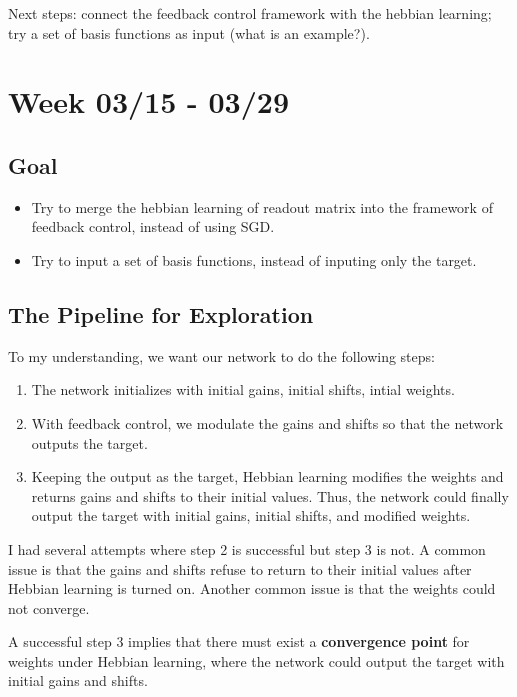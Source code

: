 \documentclass[12pt, a4paper]{article}
\begin{document}
Next steps: connect the feedback control framework with the hebbian learning; try a set of basis functions as input (what is an example?).

\newpage

\section*{Week 03/15 - 03/29}

\subsection*{Goal}

\noindent
\begin{itemize}
    \item Try to merge the hebbian learning of readout matrix into the framework of feedback control, instead of using SGD.
    \item Try to input a set of basis functions, instead of inputing only the target.

\end{itemize}

\newpage

\subsection*{The Pipeline for Exploration}

To my understanding, we want our network to do the following steps:

\begin{enumerate}
    \item The network initializes with initial gains, initial shifts, intial weights.
    \item With feedback control, we modulate the gains and shifts so that the network outputs the target.
    \item Keeping the output as the target, Hebbian learning modifies the weights and returns gains and shifts to their initial values. Thus, the network could finally output the target with initial gains, initial shifts, and modified weights. 
\end{enumerate}

I had several attempts where step 2 is successful but step 3 is not. A common issue is that the gains and shifts refuse to return to their initial values after Hebbian learning is turned on. Another common issue is that the weights could not converge.

A successful step 3 implies that there must exist a \textbf{convergence point} for weights under Hebbian learning, where the network could output the target with initial gains and shifts.
\end{document}
